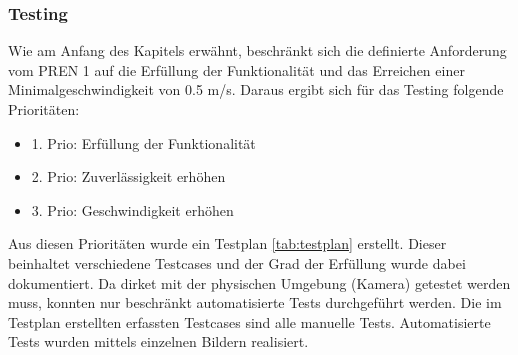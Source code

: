 \documentclass[../../main.tex]{subfiles}
\begin{document}
\subsubsection{Testing}
Wie am Anfang des Kapitels erwähnt, beschränkt sich die definierte Anforderung vom PREN 1 auf die Erfüllung der Funktionalität und das Erreichen einer Minimalgeschwindigkeit von 0.5 m/s. Daraus ergibt sich für das Testing folgende Prioritäten:
\begin{itemize}
  \item 1. Prio: Erfüllung der Funktionalität
  \item 2. Prio: Zuverlässigkeit erhöhen
  \item 3. Prio: Geschwindigkeit erhöhen
\end{itemize}

Aus diesen Prioritäten wurde ein Testplan \ref{tab:testplan} erstellt. Dieser beinhaltet verschiedene Testcases und der Grad der Erfüllung wurde dabei dokumentiert. Da dirket mit der physischen Umgebung (Kamera) getestet werden muss, konnten nur beschränkt automatisierte Tests durchgeführt werden. Die im Testplan erstellten erfassten Testcases sind alle manuelle Tests. Automatisierte Tests wurden mittels einzelnen Bildern realisiert.

\newpage
\end{document}
